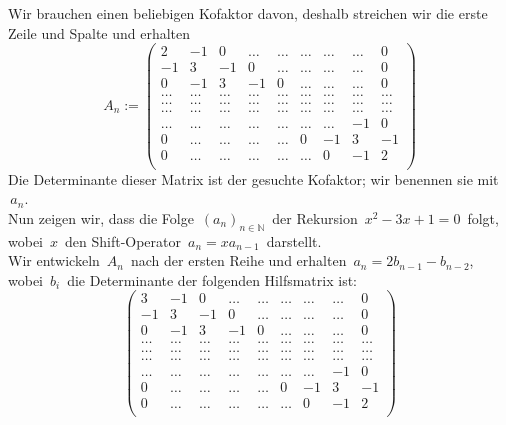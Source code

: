 Wir brauchen einen beliebigen Kofaktor davon, deshalb streichen wir die erste Zeile und Spalte und erhalten\\
\begin{equation}
A_n:=
\begin{pmatrix}
2&-1&0&\ldots&\ldots&\ldots&\ldots&\ldots&0\\
-1&3&-1&0&\ldots&\ldots&\ldots&\ldots&0\\
0&-1&3&-1&0&\ldots&\ldots&\ldots&0\\
\ldots&\ldots&\ldots&\ldots&\ldots&\ldots&\ldots&\ldots&\ldots\\
\ldots&\ldots&\ldots&\ldots&\ldots&\ldots&\ldots&\ldots&\ldots\\
\ldots&\ldots&\ldots&\ldots&\ldots&\ldots&\ldots&\ldots&\ldots\\
\ldots&\ldots&\ldots&\ldots&\ldots&\ldots&\ldots&-1&0\\
0&\ldots&\ldots&\ldots&\ldots&0&-1&3&-1\\
0&\ldots&\ldots&\ldots&\ldots&\ldots&0&-1&2\\
\end{pmatrix}
\end{equation}
Die Determinante dieser Matrix ist der gesuchte Kofaktor; wir benennen sie mit $\,a_n$.\;\\
Nun zeigen wir, dass die Folge $\,(a_n)_{n \in \mathbb{N}}\,$ der Rekursion $\,x^2-3x+1=0\,$ folgt, \\wobei $\,x\,$ den Shift-Operator $\,a_n = xa_{n-1}\,$ darstellt.\\
Wir entwickeln $\,A_n\,$ nach der ersten Reihe und erhalten $\,a_n = 2b_{n-1} - b_{n-2}$,\; wobei $\,b_i\,$ die Determinante der folgenden Hilfsmatrix ist:\\
\begin{equation}
\begin{pmatrix}
3&-1&0&\ldots&\ldots&\ldots&\ldots&\ldots&0\\
-1&3&-1&0&\ldots&\ldots&\ldots&\ldots&0\\
0&-1&3&-1&0&\ldots&\ldots&\ldots&0\\
\ldots&\ldots&\ldots&\ldots&\ldots&\ldots&\ldots&\ldots&\ldots\\
\ldots&\ldots&\ldots&\ldots&\ldots&\ldots&\ldots&\ldots&\ldots\\
\ldots&\ldots&\ldots&\ldots&\ldots&\ldots&\ldots&\ldots&\ldots\\
\ldots&\ldots&\ldots&\ldots&\ldots&\ldots&\ldots&-1&0\\
0&\ldots&\ldots&\ldots&\ldots&0&-1&3&-1\\
0&\ldots&\ldots&\ldots&\ldots&\ldots&0&-1&2\\
\end{pmatrix}
\end{equation}
